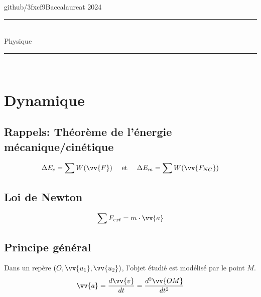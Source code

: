 \documentclass[a5paper,10pt]{article}
\newcommand{\assignmentauthor}{github/3fxcf9}
\newcommand{\assignmentdate}{Baccalaureat 2024}
\newcommand{\assignmenttitle}{Physique}
\renewcommand*{\vec}{\vv}
\begin{document}
\renewcommand{\headsep}{10pt}
\thispagestyle{empty}
\vspace*{-1cm}
\noindent\assignmentauthor \hfill \assignmentdate
\vspace{-6pt}
\begin{center}
    \rule[2ex]{\textwidth}{1pt}\\
    \vspace{-4pt}
    {\Large{\assignmenttitle}}
    \vspace{-4pt}
\end{center}
\rule[2ex]{\textwidth}{1pt}\\
\title{}
\author{}
\date{}
\vspace{-0.5cm}
\section{Dynamique}
\subsection{Rappels: Théorème de l'énergie mécanique/cinétique}
\[
	\Delta E_c = \sum W(\vec{F}) \quad\text{ et }\quad \Delta E_m = \sum W(\vec{F_{NC}})
\]

\subsection{Loi de Newton}
$$\sum{F_{ext}}=m\cdot\vec{a}$$
\subsection{Principe général}
Dans un repère $(O, \vec{u_1}, \vec{u_2})$, l'objet étudié est modélisé par le point $M$.
$$\vec{a}=\frac{d\vec{v}}{dt}=\frac{d^2\vec{OM}}{dt^2}$$
\end{document}
